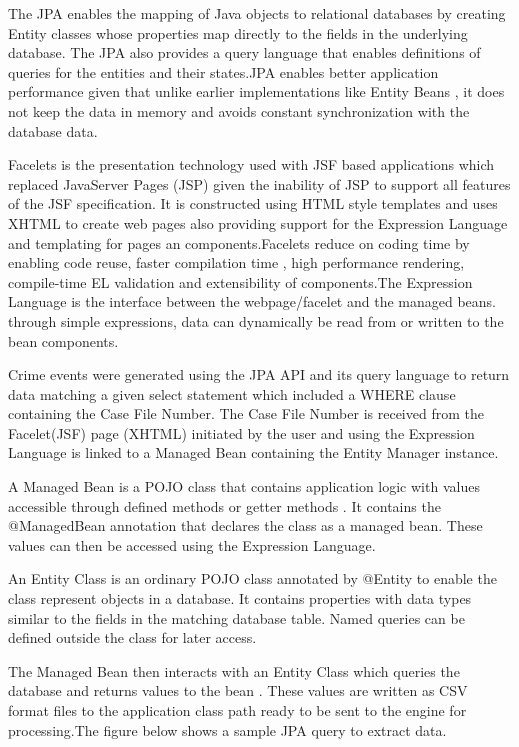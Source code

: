 \noindent The JPA \cite{twentythree} enables the mapping of Java objects to relational databases by creating Entity classes whose properties map directly to the fields in the underlying database. The JPA also provides a query language that  enables definitions of queries for the entities and their states.JPA enables better application performance given that unlike earlier implementations like Entity Beans , it does not  keep the data in memory and avoids constant synchronization with the database data.

\noindent Facelets \cite{twentythree} is the presentation technology used with JSF based applications which replaced JavaServer Pages (JSP) given the inability of JSP to  support all features of the JSF specification. It is  constructed using HTML style templates and uses XHTML to create web pages also providing support for the Expression Language and templating for pages an components.Facelets reduce on coding time by enabling code reuse, faster compilation time , high performance rendering, compile-time EL validation and extensibility of components.The Expression Language is the interface between the webpage/facelet and the managed beans. through simple expressions, data can dynamically be read from or written to the bean components.

\noindent Crime events were generated using the JPA API  and its query language to return data matching a given select statement which included a WHERE clause containing the Case File Number. The Case File Number is received from the Facelet(JSF) page (XHTML) initiated by the user and using the Expression Language \cite{twentythree} is linked to a Managed Bean \cite{twentythree} containing the Entity Manager instance. 

\noindent A Managed Bean is a POJO class that contains application logic with values accessible through defined methods or getter methods . It contains the @ManagedBean annotation that declares the class as a managed bean. These values can then be accessed using the Expression Language.

\noindent An Entity Class is an ordinary POJO class annotated by @Entity to enable the class represent objects in a database. It contains properties with data types similar to the fields in the matching  database table. Named queries can be defined outside the class for later access.

\noindent The Managed Bean then interacts with an Entity Class which queries the database and returns values to the bean . These values are written as CSV format files to the application class path  ready to be sent to the engine for processing.The figure below shows a sample  JPA query to extract data.





